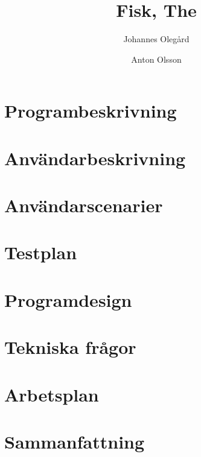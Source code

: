 \documentclass[a4paper, 11pt]{article}
\title{Fisk, The} %
\author{Johannes Olegård \and Anton Olsson}
\begin{document}
\maketitle

\section{Programbeskrivning}




\section{Användarbeskrivning}




\section{Användarscenarier}




\section{Testplan}




\section{Programdesign}




\section{Tekniska frågor}




\section{Arbetsplan}




\section{Sammanfattning}
\end{document}
